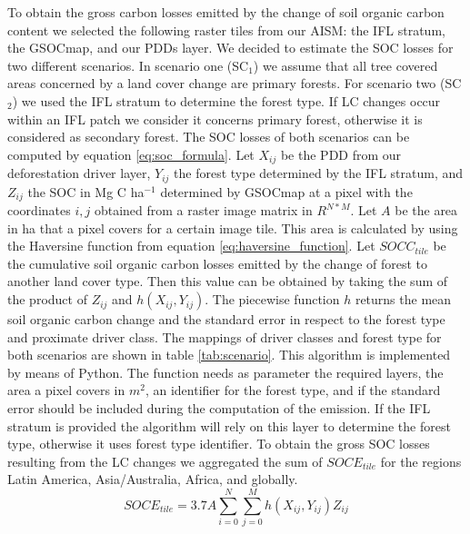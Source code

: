 		To obtain the gross carbon losses emitted by the change of soil organic carbon content we selected the following raster tiles from our \ac{AISM}: the \ac{IFL} stratum, the \ac{GSOCmap}, and our \acp{PDD} layer. We decided to estimate the \ac{SOC} losses for two different scenarios. In scenario one (SC$_1$) we assume that all tree covered areas concerned by a land cover change are primary forests. For scenario two (SC$_2$) we used the \ac{IFL} stratum to determine the forest type. If \ac{LC} changes occur within an \ac{IFL} patch we consider it concerns primary forest, otherwise it is considered as secondary forest. The \ac{SOC} losses of both scenarios can be computed by equation \ref{eq:soc_formula}. Let $X_{ij}$ be the \ac{PDD} from our deforestation driver layer, $Y_{ij}$ the forest type determined by the \ac{IFL} stratum, and $Z_{ij}$ the \ac{SOC} in Mg C ha$^{-1}$ determined by \ac{GSOCmap} at a pixel with the coordinates $i,j$ obtained from a raster image matrix in $R^{N*M}$. Let $A$ be the area in ha that a pixel covers for a certain image tile. This area is calculated by using the Haversine function from equation \ref{eq:haversine_function}. Let $SOCC_{tile}$ be the cumulative soil organic carbon losses emitted by the change of forest to another land cover type. Then this value can be obtained by taking the sum of the product of $Z_{ij}$ and $h(X_{ij}, Y_{ij})$. The piecewise function $h$ returns the mean soil organic carbon change and the standard error in respect to the forest type and proximate driver class. The mappings of driver classes and forest type for both scenarios are shown in table \ref{tab:scenario}. This algorithm is implemented by means of Python. The function needs as parameter the required layers, the area a pixel covers in $m^2$, an identifier for the forest type, and if the standard error should be included during the computation of the emission. If the \ac{IFL} stratum is provided the algorithm will rely on this layer to determine the forest type, otherwise it uses forest type identifier. To obtain the gross \ac{SOC} losses resulting from the \ac{LC} changes we aggregated the sum of $SOCE_{tile}$ for the regions Latin America, Asia/Australia, Africa, and globally. 
		\begin{equation}
		\label{eq:soc_formula}
			SOCE_{tile} = 3.7A\displaystyle\sum_{i=0}^{N}\displaystyle\sum_{j=0}^{M} h(X_{ij}, Y_{ij})Z_{ij}
		\end{equation}
